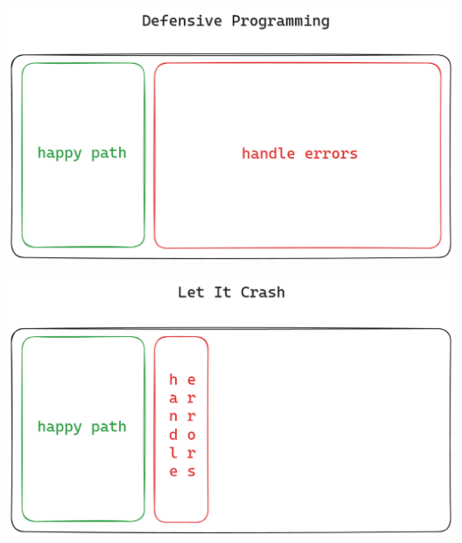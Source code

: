 \documentclass[10pt]{beamer}
\begin{document}
\begin{frame}
  \centering
  \includegraphics[scale=0.16]{defensive-programming}
  \par \bigskip
  \par \bigskip
  \includegraphics[scale=0.16]{let-it-crash}
\end{frame}
\end{document}
